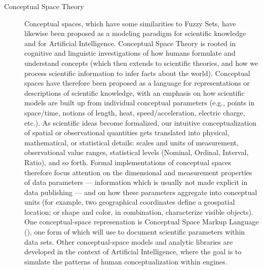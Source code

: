 \documentclass[11pt,letterpaper]{article}
\newcommand{\CSML}{\resizebox{!}{7pt}{\AcronymText{CSML}}}
\newcommand{\AI}{\resizebox{!}{7pt}{\AcronymText{AI}}}
\newcommand{\textscc}[1]{{\color{orr!35!black}{{%
						\fontfamily{Cabin-TLF}\fontseries{b}\selectfont{\textsc{\scriptsize{#1}}}}}}}
\newcommand{\AcronymText}[1]{{\textscc{#1}}}
\newcommand{\CRtwo}{{\resizebox{!}{7pt}{\AcronymText{CR2}}}}
\begin{document}
{{\begin{description}
\item[Conceptual Space Theory]  Conceptual spaces, 
which have some similarities to Fuzzy Sets, 
have likewise been proposed as a modeling paradigm 
for scientific knowledge and for Artificial 
Intelligence.  Conceptual Space Theory is 
rooted in cognitive and linguistic investigations 
of how humans formulate and understand concepts 
(which then extends to scientific theories, and 
how we process scientific information to infer 
facts about the world).  Conceptual spaces have therefore 
been proposed as a language for representations or descriptions 
of scientific knowledge, with an emphasis on how 
scientific models are built up from individual 
conceptual parameters (e.g., points in space/time, 
notions of length, heat, speed/acceleration, electric 
charge, etc.).  As scientific ideas become formalized, 
our intuitive conceptualization of spatial or observational 
quantities gets translated into physical, mathematical, or 
statistical details: scales and units of measurement, 
observational value ranges, statistical levels 
(Nominal, Ordinal, Interval, Ratio), and so forth.  
Formal implementations of conceptual spaces therefore 
focus attention on the dimensional and measurement 
properties of data parameters --- information 
which is usually not made explicit in data publishing 
--- and on how these parameters aggregate into conceptual 
units (for example, two geographical coordinates define a 
geospatial location; or shape and color, in combination, characterize 
visible objects).  One conceptual-space represenation is 
Conceptual Space Markup Language (\CSML{}), one form of 
which \CRtwo{} will use to document scientific parameters 
within data sets.  Other conceptual-space models and 
analytic libraries are developed in the context 
of Artificial Intelligence, where the goal is to 
simulate the patterns of human conceptualization within 
\AI{} engines.  
   

\end{description}}}
\end{document}
